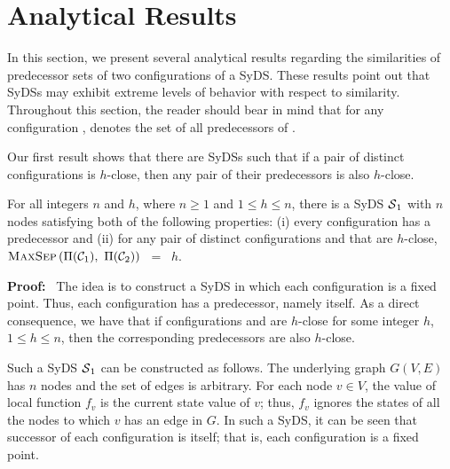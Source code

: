 \section{Analytical Results}
\label{sec:analysis}

In this section, we present several analytical results regarding the
similarities of predecessor sets of two configurations of a SyDS.
These results point out that SyDSs may exhibit 
extreme levels of behavior with respect to similarity.
Throughout this section, the reader should bear in mind that
for any configuration \calc, \predset{\calc}{}
denotes the set of all predecessors of \calc.

Our first result shows that there are SyDSs such that 
if a pair of distinct configurations is $h$-close, then 
any pair of their predecessors is also $h$-close.



\begin{proposition}\label{pro:close-close}
For all integers $n$ and $h$, where $n \geq 1$ and $1 \leq h \leq n$,
there is a SyDS $\mbox{$\mathcal{S}$}_1${} with $n$
nodes satisfying both of the following properties: 
(i) every configuration has a predecessor and (ii) 
for any pair of distinct configurations
\calcone{} and \calctwo{} that are $h$-close, 
$\mbox{\textsc{MaxSep}}\left( \mbox{$\Pi(\mbox{$\mathcal{C}_{1}$})$},~ \mbox{$\Pi(\mbox{$\mathcal{C}_{2}$})$} \right)$ ~=~ $h$.
\end{proposition}

\noindent
\textbf{Proof:}~ The idea is to construct a SyDS in which each configuration
is a fixed point.
Thus, each configuration \calc{} has a predecessor, namely \calc{} itself.
As a direct consequence, we have that if configurations \calcone{} and
\calctwo{} are $h$-close for some integer $h$, $1 \leq h \leq n$,
then the corresponding predecessors are also $h$-close.

Such a SyDS $\mbox{$\mathcal{S}$}_1${} can be constructed as follows.
The underlying graph $G(V,E)$ has $n$ nodes and the set of edges is arbitrary.
For each node $v \in V$, the value of local function $f_v$ is the 
current state value of $v$; thus, $f_v$ ignores the states of all the nodes
to which $v$ has an edge in $G$.
In such a SyDS, it can be seen that successor of each configuration \calc{}
is \calc{} itself; that is, each configuration is a fixed point. \QED

